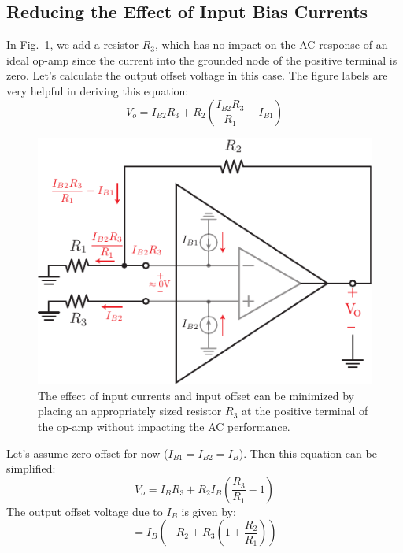 \subsection{Reducing the Effect of Input Bias Currents}
In Fig.~\ref{fig:opamp_offset_reduce}, we add a resistor $R_3$, which has no impact on the AC response of an ideal op-amp since the current into the grounded node of the positive terminal is zero.  Let's calculate the output offset voltage in this case.  The figure labels are very helpful in deriving this equation:
\begin{equation}
      V_o = I_{B2} R_3 + R_2 \left(  \frac{I_{B2}R_3}{R_1} - I_{B1}  \right)
\end{equation}
\begin{figure}[tb]
\centering
\includegraphics[scale=1]{opamp_offset_reduce}
\caption{The effect of input currents and input offset can be minimized by placing an appropriately sized resistor $R_3$ at the positive terminal of the op-amp without impacting the AC performance.} \label{fig:opamp_offset_reduce}
\end{figure}
\noindent Let's assume zero offset for now ($I_{B1} = I_{B2} = I_B$).  Then this equation can be simplified:
    \begin{equation}
        V_o = I_{B} R_3 + R_2 I_B \left( \frac{R_3}{R_1} - 1 \right)
    \end{equation}
The output offset voltage due to $I_B$ is given by:
    \begin{equation}
        = I_{B}  \left( -R_2 + R_3\left(1+ \frac{R_2}{R_1}  \right)  \right)
    \end{equation}
